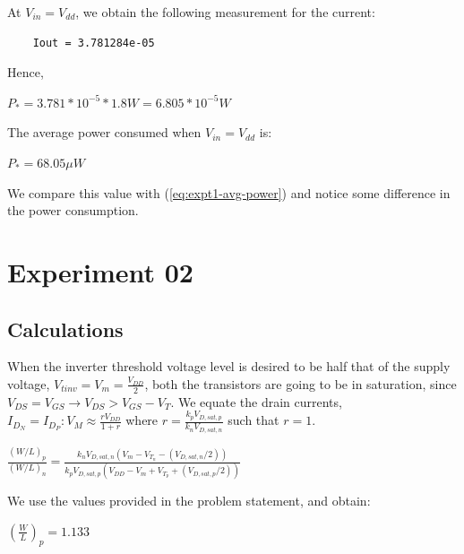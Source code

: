 \documentclass[12pt,a4paper]{article}
\begin{document}
\noindent At $V_{in} = V_{dd}$, we obtain the following measurement for the current:

\begin{verbatim}
    Iout = 3.781284e-05
\end{verbatim}

\noindent Hence,
\doublespacing
\begin{center}
    $P_* = 3.781 * 10^{-5} * 1.8 W = 6.805 * 10^{-5} W$
\end{center}
\doublespacing
\noindent The average power consumed when $V_{in} = V_{dd}$ is:
\doublespacing
\begin{center}
    $P_* = 68.05 \mu W$
\end{center}
\singlespacing
\noindent We compare this value with (\ref{eq:expt1-avg-power}) and notice some difference in the power consumption.

\section{Experiment 02}
\subsection{Calculations}
\noindent When the inverter threshold voltage level is desired to be half that of the supply voltage, $V_{tinv} = V_{m} = \frac{V_{DD}}{2}$, both the transistors are going to be in saturation, since $V_{DS} = V_{GS} \rightarrow V_{DS} > V_{GS} - V_T$. We equate the drain currents, $I_{D_N} = I_{D_P} : V_M \approx \frac{rV_{DD}}{1+r}$ where $r = \frac{k_pV_{D,sat,p}}{k_nV_{D,sat,n}}$ such that $r=1$.

\doublespacing
\begin{center}
    $\frac{(W/L)_p}{(W/L)_n} = \frac{k_nV_{D,sat,n}(V_m-V_{T_n} - (V_{D,sat,n}/2))}{k_pV_{D,sat,p}(V_{DD}-V_m+V_{T_p} + (V_{D,sat,p}/2))}$
\end{center}
\singlespacing

\noindent We use the values provided in the problem statement, and obtain:

\doublespacing
\begin{center}
    $(\frac{W}{L})_{p} = 1.133$
\end{center}
\singlespacing
\end{document}
